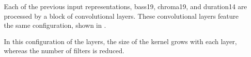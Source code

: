 

Each of the previous input representations, \gls{bass19},
\gls{chroma19}, and \gls{duration14} are processed by a
block of convolutional layers. These convolutional layers
feature the same configuration, shown in
.


In this configuration of the layers, the size of the kernel
grows with each layer, whereas the number of filters is
reduced.

